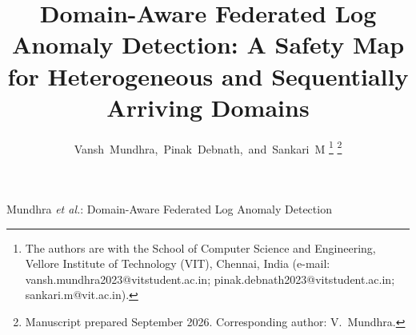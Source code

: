 \documentclass[journal]{IEEEtran}
\begin{document}
\title{Domain-Aware Federated Log Anomaly Detection: A Safety Map for Heterogeneous
and Sequentially Arriving Domains}

\author{Vansh~Mundhra,~Pinak~Debnath,~and~Sankari~M%
\thanks{The authors are with the School of Computer Science and Engineering,
Vellore Institute of Technology (VIT), Chennai, India
(e-mail: vansh.mundhra2023@vitstudent.ac.in; pinak.debnath2023@vitstudent.ac.in;
sankari.m@vit.ac.in).}%
\thanks{Manuscript prepared September 2026. Corresponding author: V.~Mundhra.}}

%
{Mundhra \MakeLowercase{\textit{et al.}}: Domain-Aware Federated Log Anomaly Detection}

\maketitle
\end{document}
